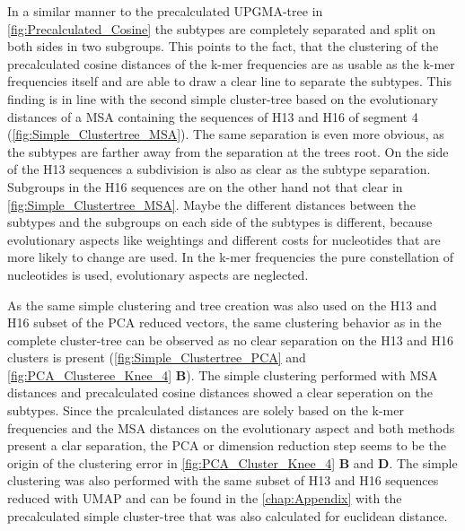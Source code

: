 In a similar manner to the precalculated \gls{UPGMA}-tree in \autoref{fig:Precalculated_Cosine} the subtypes are completely separated and split on both sides in two subgroups. This points to the fact, that the clustering of the precalculated cosine distances of the k-mer frequencies are as usable as the k-mer frequencies itself and are able to draw a clear line to separate the subtypes. This finding is in line with the second simple cluster-tree based on the evolutionary distances of a \gls{MSA} containing the sequences of H13 and H16 of segment 4 (\autoref{fig:Simple_Clustertree_MSA}). The same separation is even more obvious, as the subtypes are farther away from the separation at the trees root. On the side of the H13 sequences a subdivision is also as clear as the subtype separation. Subgroups in the H16 sequences are on the other hand not that clear in \autoref{fig:Simple_Clustertree_MSA}. Maybe the different distances between the subtypes and the subgroups on each side of the subtypes is different, because evolutionary aspects like weightings and different costs for nucleotides that are more likely to change are used. In the k-mer frequencies the pure constellation of nucleotides is used, evolutionary aspects are neglected.  

As the same simple clustering and tree creation was also used on the H13 and H16 subset of the \gls{PCA} reduced vectors, the same clustering behavior as in the complete cluster-tree can be observed as no clear separation on the H13 and H16 clusters is present (\autoref{fig:Simple_Clustertree_PCA} and \autoref{fig:PCA_Clusteree_Knee_4} \textbf{\textsf{B}}). The simple clustering performed with \gls{MSA} distances and precalculated cosine distances showed a clear seperation on the subtypes. Since the prcalculated distances are solely based on the k-mer frequencies and the \gls{MSA} distances on the evolutionary aspect and both methods present a clar separation, the \gls{PCA} or dimension reduction step seems to be the origin of the clustering error in \autoref{fig:PCA_Cluster_Knee_4} \textbf{\textsf{B}} and \textbf{\textsf{D}}. The simple clustering was also performed with the same subset of H13 and H16 sequences reduced with \gls{UMAP} and can be found in the \autoref{chap:Appendix} with the precalculated simple cluster-tree that was also calculated for euclidean distance.